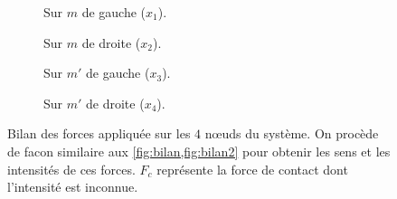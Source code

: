 \begin{figure}[!h]
    \begin{subfigure}[b]{0.30\textwidth}
        \centering
        \caption{Sur $m$ de gauche ($x_1$).}
        \label{fig:bilan13}
    \end{subfigure}
    \begin{subfigure}[b]{0.42\textwidth}
        \centering
        \caption{Sur $m$ de droite ($x_2$).}
        \label{fig:bilan23}
    \end{subfigure}
    \begin{subfigure}[b]{0.423\textwidth}
        \centering
        \caption{Sur $m'$ de gauche ($x_3$).}
        \label{fig:bilan33}
    \end{subfigure}
    \begin{subfigure}[b]{0.297\textwidth}
        \centering
        \caption{Sur $m'$ de droite ($x_4$).}
        \label{fig:bilan43}
    \end{subfigure}
       \caption{Bilan des forces appliquée sur les $4$ n\oe{}uds du système. On procède de facon similaire aux \cref{fig:bilan,fig:bilan2} pour obtenir les sens et les intensités de ces forces. $F_c$ représente la force de contact dont l'intensité est inconnue.}
       \label{fig:bilan3}
\end{figure}


